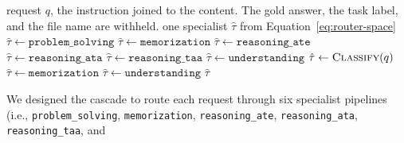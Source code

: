 \documentclass[5p,times,authoryear]{elsarticle}
\begin{document}
\begin{algorithm}[t]
\caption{Cascade router. Six pipelines are tested in order. Reasoning is split here into technique extraction, technique attribution, and threat-actor attribution. Retrieval begins in Algorithm~\ref{alg:pipe}.}
\label{alg:cta}
\begin{algorithmic}[1]
\Require request $q$, the instruction joined to the content. The gold answer, the task label, and the file name are withheld.
\Ensure one specialist $\hat{\tau}$ from Equation~\eqref{eq:router-space}
  \State $\hat{\tau} \gets \texttt{problem\_solving}$ 
  \State $\hat{\tau} \gets \texttt{memorization}$ 
  \State $\hat{\tau} \gets \texttt{reasoning\_ate}$ 
  \State $\hat{\tau} \gets \texttt{reasoning\_ata}$ 
  \State $\hat{\tau} \gets \texttt{reasoning\_taa}$ 
  \State $\hat{\tau} \gets \texttt{understanding}$ 
\Else
  \State $\hat{\tau} \gets \textsc{Classify}(q)$ 
    \State $\hat{\tau} \gets \texttt{memorization}$
    \State $\hat{\tau} \gets \texttt{understanding}$
  \EndIf
\EndIf
\State \Return $\hat{\tau}$
\end{algorithmic}
\end{algorithm}
We designed the cascade to route each request through six specialist pipelines (i.e., \texttt{problem\_solving}, \texttt{memorization}, \texttt{reasoning\_ate}, \texttt{reasoning\_ata}, \texttt{reasoning\_taa}, and 
\newline
\end{document}

